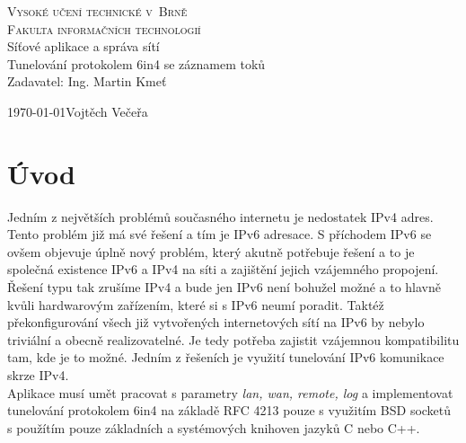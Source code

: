 \documentclass[12pt,a4paper,onecolumn]{article}
\begin{document}
\begin{titlepage}
    \begin{center}
        \textsc{\Huge Vysoké učení technické v~Brně\\\huge Fakulta informačních technologií}\\
        \LARGE Síťové aplikace a správa sítí\\
        \Huge Tunelování protokolem 6in4 se záznamem toků\\
        \large Zadavatel: Ing. Martin Kmeť\\
    \end{center}
    {\Large\today\hfill Vojtěch Večeřa }
\end{titlepage}
\tableofcontents
\newpage
\section{Úvod}
Jedním z největších problémů současného internetu je nedostatek IPv4 adres. Tento problém již má
své řešení a tím je IPv6 adresace. S příchodem IPv6 se ovšem objevuje úplně nový problém, který
akutně potřebuje řešení a to je společná existence IPv6 a IPv4 na síti a zajištění jejich
vzájemného propojení. Řešení typu tak zrušíme IPv4 a bude jen IPv6 není bohužel možné a to hlavně
kvůli hardwarovým zařízením, které si s IPv6 neumí poradit. Taktéž překonfigurování všech
již vytvořených internetových sítí na IPv6 by nebylo triviální a obecně realizovatelné. Je tedy
potřeba zajistit vzájemnou kompatibilitu tam, kde je to možné. Jedním z řešeních je využití
tunelování IPv6 komunikace skrze IPv4.\\
\indent Aplikace musí umět pracovat s parametry \textit{lan, wan, remote, log} a implementovat
tunelování protokolem 6in4 na základě RFC 4213 pouze s využitím BSD socketů s použítím pouze
základních a systémových knihoven jazyků C nebo C++. 
\end{document}
